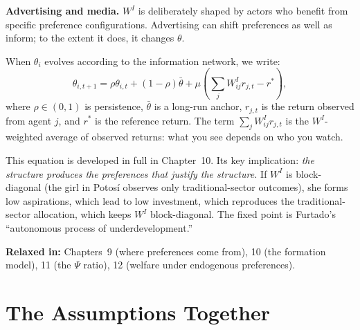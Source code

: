 \documentclass[../structural_economics_book.tex]{subfiles}
\begin{document}
\textbf{Advertising and media.} $W^I$ is deliberately shaped by actors who benefit from specific preference configurations. Advertising can shift preferences as well as inform; to the extent it does, it changes $\theta$.

\begin{definition}\label{ch04:prop:A6_formation}
When $\theta_i$ evolves according to the information network, we write:
\begin{equation}\label{ch04:eq:formation_preview}
\theta_{i,t+1} = \rho\theta_{i,t} + (1-\rho)\bar{\theta} + \mu\left(\sum_j W^I_{ij} r_{j,t} - r^*\right),
\end{equation}
where $\rho \in (0,1)$ is persistence, $\bar{\theta}$ is a long-run anchor, $r_{j,t}$ is the return observed from agent $j$, and $r^*$ is the reference return. The term $\sum_j W^I_{ij} r_{j,t}$ is the $W^I$-weighted average of observed returns: what you see depends on who you watch.
\end{definition}

This equation is developed in full in Chapter~10. Its key implication: \textit{the structure produces the preferences that justify the structure.} If $W^I$ is block-diagonal (the girl in Potos\'{i} observes only traditional-sector outcomes), she forms low aspirations, which lead to low investment, which reproduces the traditional-sector allocation, which keeps $W^I$ block-diagonal. The fixed point is Furtado's ``autonomous process of underdevelopment.''

\textbf{Relaxed in:} Chapters~9 (where preferences come from), 10 (the formation model), 11 (the $\Psi$ ratio), 12 (welfare under endogenous preferences).


\section{The Assumptions Together}
\label{ch04:sec:together}
\end{document}
